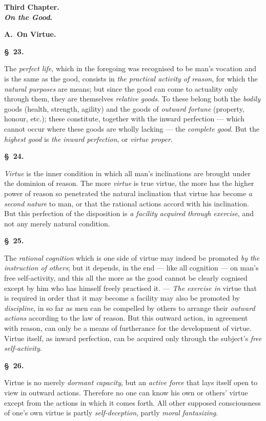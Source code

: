 \documentclass[12pt]{article}
\newcommand{\opage}[1]{\marginnote{\footnotesize\textit{[#1]}}}
\newcommand{\slaw}[1]{\par\medskip\begin{center}\textbf{\S~#1.}\end{center}\nopagebreak}
\newcommand{\mchap}[2]{\par\bigskip\begin{center}\large\textbf{#1}\\[0.3em]\textbf{#2}\end{center}\medskip}
\begin{document}
\mchap{Third Chapter.}{\emph{On the Good}.}

\begin{center}\textbf{A.\ On Virtue.}\end{center}

\slaw{23}
The \emph{perfect life}, which in the foregoing was recognised to be man's vocation and is the same as the good, consists in \emph{the practical activity of reason}, for which the \emph{natural purposes} are means; but since the good can come to actuality only through them, they are themselves \emph{relative goods}. To these belong both the \emph{bodily} goods (health, strength, agility) and the goods of \emph{outward fortune} (property, honour, etc.); these constitute, together with the inward perfection --- which cannot occur where these goods are wholly lacking --- the \emph{complete good}. But the \emph{highest good} is \emph{the inward perfection}, or \emph{virtue proper}.

\slaw{24}
\emph{Virtue} is the inner condition in which all man's inclinations are brought under the dominion of reason. The more \emph{virtue} is true virtue, the more has the higher power of reason so penetrated the natural inclination that virtue has become \emph{a second nature} to man, or that the rational actions accord with his inclination. But this perfection of the disposition is \emph{a facility acquired through exercise}, and not any merely natural condition.

\slaw{25}
The \emph{rational cognition} which is one side of virtue may indeed be promoted \emph{by the instruction of others}; but \opage{154}it depends, in the end --- like all cognition --- on man's free self-activity, and this all the more as the good cannot be clearly cognised except by him who has himself freely practised it. --- \emph{The exercise in} virtue that is required in order that it may become a facility may also be promoted by \emph{discipline}, in so far as men can be compelled by others to arrange their \emph{outward actions} according to the law of reason. But this outward action, in agreement with reason, can only be a means of furtherance for the development of virtue. Virtue itself, as inward perfection, can be acquired only through the subject's \emph{free self-activity}.

\slaw{26}
Virtue is no merely \emph{dormant capacity}, but an \emph{active force} that lays itself open to view in outward actions. Therefore no one can know his own or others' virtue except from the actions in which it comes forth. All other supposed consciousness of one's own virtue is partly \emph{self-deception}, partly \emph{moral fantasizing}.
\end{document}
